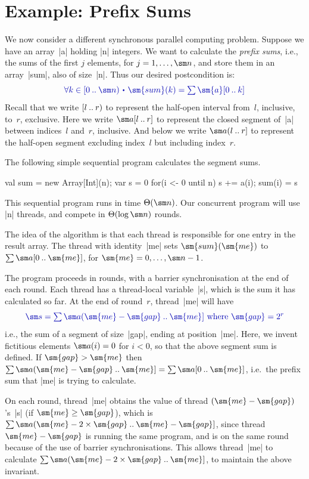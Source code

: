 \section{Example: Prefix Sums}

\def\revint#1#2{(#1 \upto #2]}

We now consider a different synchronous parallel computing problem.  Suppose
we have an array~|a| holding |n| integers.  We want to calculate the
\emph{prefix sums}, i.e., the sums of the first $j$ elements, for $j = 1,
\ldots, \sm n$, and store them in an array~|sum|, also of size~|n|.  Thus our
desired postcondition is:
\[\mstyle
\forall k \in \interval{0}{\sm n} \spot 
  \sm{sum}(k) = \textstyle\sum \sm{a}[0 \upto k] 
\]
Recall that we write $[l \mathbin{..} r)$ to represent the half-open interval
from~$l$, inclusive, to~$r$, exclusive.  Here we write $\sm a[l \upto r]$ to
represent the closed segment of~|a| between indices~$l$ and~$r$, inclusive.
And below we write $\sm a (l\upto r]$ to represent the half-open segment
  excluding index~$l$ but including index~$r$.

The following simple sequential program calculates the segment sums.
\begin{scala}
  val sum = new Array[Int](n); var s = 0
  for(i <- 0 until n){ s += a(i); sum(i) = s }
\end{scala}
%
This sequential program runs in time $\Theta(\sm n)$.  Our concurrent program
will use |n| threads, and compete in $\Theta(\log \sm n)$ rounds. 

The idea of the algorithm is that each thread is responsible for one entry in
the result array.  The thread with identity~|me| sets $\sm{sum}(\sm{me})$ to
$\sum \sm a[0 \upto \sm{me}]$, for $\sm{me} = 0,\ldots,\sm n-1$.

The program proceeds in rounds, with a barrier synchronisation at the end of
each round.  Each thread has a thread-local variable~|s|, which is the sum it
has calculated so far.  At the end of round~$r$, thread~|me| will have
\[\mstyle
\sm s = \textstyle\sum \sm a(\sm{me}-\sm{gap} \upto \sm{me}]
   \mbox{ where } \sm{gap} = 2^r
\]
i.e., the sum of a segment of size~|gap|, ending at position~|me|.  Here, we
invent fictitious elements $\sm a(i) = 0$ for $i < 0$, so that the above
segment sum is defined.  If $\sm{gap} > \sm{me}$ then $\sum \sm
a\revint{\sm{me}-\sm{gap}}{\sm{me}} = \sum \sm a[0 \upto \sm{me}]$, i.e.~the
prefix sum that |me| is trying to calculate.

On each round, thread~|me| obtains the value of thread
$(\sm{me}-\sm{gap})$'s~|s| (if $\sm{me} \ge \sm{gap}$), which is $\sum \sm
a\revint{\sm{me}-2 \times \sm{gap}}{\sm{me}-\sm{gap}}$, since thread
$\sm{me}-\sm{gap}$ is running the same program, and is on the same round
because of the use of barrier synchronisations.  This allows thread~|me| to
calculate $\sum \sm a\revint{\sm{me}-2 \times \sm{gap}}{\sm{me}}$, to maintain
the above invariant.


